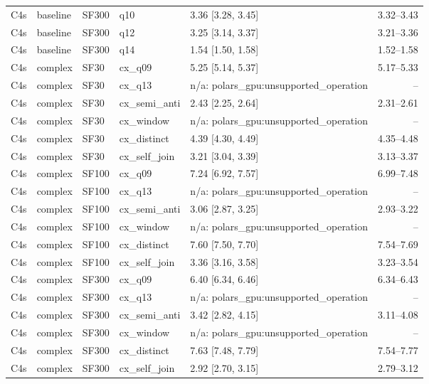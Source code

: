 \begin{longtable}{lllllr}
C4s & baseline & SF300 & q10 & 3.36 [3.28, 3.45] & 3.32--3.43 \\
C4s & baseline & SF300 & q12 & 3.25 [3.14, 3.37] & 3.21--3.36 \\
C4s & baseline & SF300 & q14 & 1.54 [1.50, 1.58] & 1.52--1.58 \\
C4s & complex & SF30 & cx\_q09 & 5.25 [5.14, 5.37] & 5.17--5.33 \\
C4s & complex & SF30 & cx\_q13 & n/a: polars\_gpu:unsupported\_operation & -- \\
C4s & complex & SF30 & cx\_semi\_anti & 2.43 [2.25, 2.64] & 2.31--2.61 \\
C4s & complex & SF30 & cx\_window & n/a: polars\_gpu:unsupported\_operation & -- \\
C4s & complex & SF30 & cx\_distinct & 4.39 [4.30, 4.49] & 4.35--4.48 \\
C4s & complex & SF30 & cx\_self\_join & 3.21 [3.04, 3.39] & 3.13--3.37 \\
C4s & complex & SF100 & cx\_q09 & 7.24 [6.92, 7.57] & 6.99--7.48 \\
C4s & complex & SF100 & cx\_q13 & n/a: polars\_gpu:unsupported\_operation & -- \\
C4s & complex & SF100 & cx\_semi\_anti & 3.06 [2.87, 3.25] & 2.93--3.22 \\
C4s & complex & SF100 & cx\_window & n/a: polars\_gpu:unsupported\_operation & -- \\
C4s & complex & SF100 & cx\_distinct & 7.60 [7.50, 7.70] & 7.54--7.69 \\
C4s & complex & SF100 & cx\_self\_join & 3.36 [3.16, 3.58] & 3.23--3.54 \\
C4s & complex & SF300 & cx\_q09 & 6.40 [6.34, 6.46] & 6.34--6.43 \\
C4s & complex & SF300 & cx\_q13 & n/a: polars\_gpu:unsupported\_operation & -- \\
C4s & complex & SF300 & cx\_semi\_anti & 3.42 [2.82, 4.15] & 3.11--4.08 \\
C4s & complex & SF300 & cx\_window & n/a: polars\_gpu:unsupported\_operation & -- \\
C4s & complex & SF300 & cx\_distinct & 7.63 [7.48, 7.79] & 7.54--7.77 \\
C4s & complex & SF300 & cx\_self\_join & 2.92 [2.70, 3.15] & 2.79--3.12 \\
\end{longtable}
